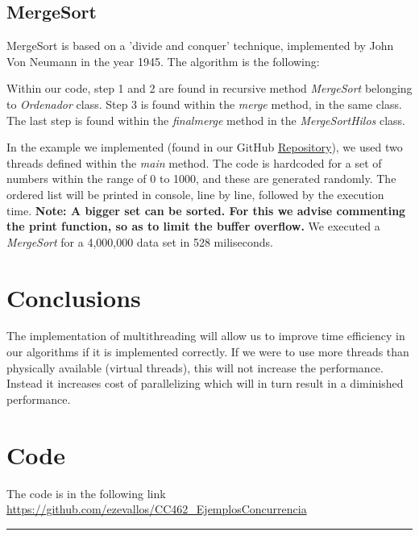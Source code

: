 \documentclass[10pt,a4paper]{article}
\theoremstyle{definition}
\begin{document}
\subsection{MergeSort}
MergeSort is based on a 'divide and conquer' technique, implemented by John Von Neumann in the year 1945. The algorithm is the following:

Within our code, step 1 and 2 are found in recursive method \emph{MergeSort} belonging to \emph{Ordenador} class. Step 3 is found within the \emph{merge} method, in the same class. The last step is found within the \emph{finalmerge} method in the \emph{MergeSortHilos} class.

In the example we implemented (found in our GitHub \href{https://github.com/ezevallos/CC462_Battle-City}{Repository}), we used two threads defined within the \emph{main} method. The code is hardcoded for a set of numbers within the range of 0 to 1000, and these are generated randomly. The ordered list will be printed in console, line by line, followed by the execution time. \textbf{Note: A bigger set can be sorted. For this we advise commenting the print function, so as to limit the buffer overflow.} We executed a \emph{MergeSort} for a 4,000,000 data set in 528 miliseconds. 

\section{Conclusions}
The implementation of multithreading will allow us to improve time efficiency in our algorithms if it is implemented correctly. If we were to use more threads than physically available (virtual threads), this will not increase
the performance. Instead it increases cost of parallelizing which will in turn result in a diminished performance.
\section{Code}
The code is in the following link \url{https://github.com/ezevallos/CC462_EjemplosConcurrencia}



\vspace{20pt}
\hrule
\vspace{10pt}

\nocite{*}
%



\end{document}
